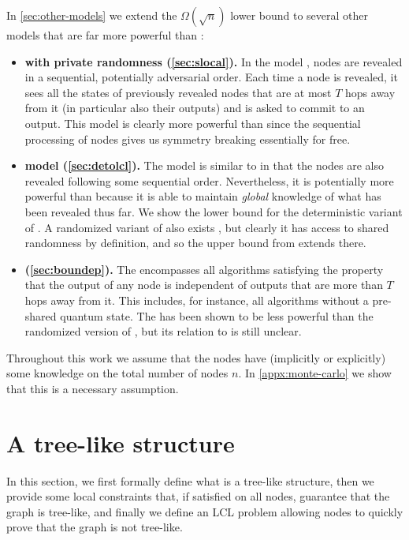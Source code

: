 \documentclass[11pt]{article}
\begin{document}
In \cref{sec:other-models} we extend the $\Omega(\sqrt n)$ lower bound to
several other models that are far more powerful than \local:
\begin{itemize}
	\item \textbf{\slocal with private randomness (\cref{sec:slocal}).}
	In the \slocal model \cite{ghaffari17_complexity_stoc}, nodes are revealed in
	a sequential, potentially adversarial order.
	Each time a node is revealed, it sees all the states of previously revealed
	nodes that are at most $T$ hops away from it (in particular also their
	outputs) and is asked to commit to an output.
	This model is clearly more powerful than \local since the sequential
	processing of nodes gives us symmetry breaking essentially for free.
	\item \textbf{\Detolcl model (\cref{sec:detolcl}).}
	The \detolcl model \cite{akbari23_locality_icalp} is similar to \slocal
	in that the nodes are also revealed following some sequential order.
	Nevertheless, it is potentially more powerful than \slocal because it is able
	to maintain \emph{global} knowledge of what has been revealed thus far. 
	We show the lower bound for the deterministic variant of \onlinelocal.
	A randomized variant of \onlinelocal also exists
	\cite{akbari24_online_arxiv}, but clearly it has access to shared
	randomness by definition, and so the upper bound from \local extends there.
	\item \textbf{\Boundep (\cref{sec:boundep}).}
	The \boundep encompasses all algorithms satisfying the property that the
	output of any node is independent of outputs that are more than $T$ hops away
	from it.
	This includes, for instance, all \qlocal algorithms without a pre-shared
	quantum state.
	The \boundep has been shown to be less powerful than the randomized version of
	\onlinelocal \cite{akbari24_online_arxiv}, but its relation to
	\detolcl is still unclear.
\end{itemize}

Throughout this work we assume that the nodes have (implicitly or explicitly) some knowledge on the total number of nodes $n$. In \cref{appx:monte-carlo} we show that this is a necessary assumption.


\section{A tree-like structure}\label{sec:treelike}
In this section, we first formally define what is a tree-like structure, then we provide some local constraints that, if satisfied on all nodes, guarantee that the graph is tree-like, and finally we define an LCL problem allowing nodes to quickly prove that the graph is not tree-like.
\end{document}
